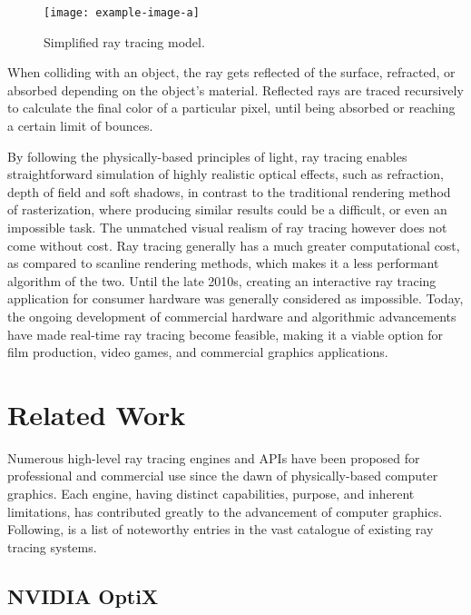 \vfill
\begin{figure}[!ht]
    \centering
    \texttt{[image: example-image-a]}
    \caption{Simplified ray tracing model.}
    \label{fig:Introduction/RayTracing/rt1}
\end{figure}
\vfill

When colliding with an object, the ray gets reflected of the surface, refracted, or absorbed depending on the object's material. 
Reflected rays are traced recursively to calculate the final color of a particular pixel, until being absorbed or reaching a certain limit of bounces.  

By following the physically-based principles of light, ray tracing enables straightforward simulation of highly realistic optical effects, such as refraction, depth of field and soft shadows, in contrast to the traditional rendering method of rasterization, where producing similar results could be a difficult, or even an impossible task. 
The unmatched visual realism of ray tracing however does not come without cost. 
Ray tracing generally has a much greater computational cost, as compared to scanline rendering methods, which makes it a less performant algorithm of the two.
Until the late 2010s, creating an interactive ray tracing application for consumer hardware was generally considered as impossible.
Today, the ongoing development of commercial hardware and algorithmic advancements have made real-time ray tracing become feasible, making it a viable option for film production, video games, and commercial graphics applications.

\section{Related Work}

Numerous high-level ray tracing engines and APIs have been proposed for professional and commercial use since the dawn of physically-based computer graphics.
Each engine, having distinct capabilities, purpose, and inherent limitations, has contributed greatly to the advancement of computer graphics. 
Following, is a list of noteworthy entries in the vast catalogue of existing ray tracing systems.

\subsection{NVIDIA OptiX}

